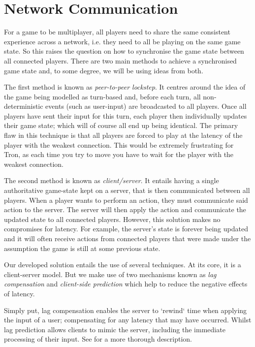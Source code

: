 \documentclass{standalone}
\begin{document}
	\section{Network Communication}
		For a game to be multiplayer, all players need to share the same consistent experience across a network, i.e. they need to all be playing on the same game state. So this raises the question on how to synchronise the game state between all connected players. There are two main methods to achieve a synchronised game state and, to some degree, we will be using ideas from both.

		The first method is known as \emph{peer-to-peer lockstep}. It centres around the idea of the game being modelled as turn-based and, before each turn, all non-deterministic events (such as user-input) are broadcasted to all players. Once all players have sent their input for this turn, each player then individually updates their game state; which will of course all end up being identical. The primary flaw in this technique is that all players are forced to play at the latency of the player with the weakest connection. This would be extremely frustrating for Tron, as each time you try to move you have to wait for the player with the weakest connection.

		The second method is known as \emph{client/server}. It entails having a single authoritative game-state kept on a server, that is then communicated between all players. When a player wants to perform an action, they must communicate said action to the server. The server will then apply the action and communicate the updated state to all connected players. However, this solution makes no compromises for latency. For example, the server's state is forever being updated and it will often receive actions from connected players that were made under the assumption the game is still at some previous state.

		Our developed solution entails the use of several techniques. At its core, it is a client-server model. But we make use of two mechanisms known as \emph{lag compensation}\parencite{LagCompensation} and \emph{client-side prediction}\parencite{LagPrediction} which help to reduce the negative effects of latency.\label{sec:lagCompensation}

		Simply put, lag compensation enables the server to `rewind` time when applying the input of a user; compensating for any latency that may have occurred. Whilst lag prediction allows clients to mimic the server, including the immediate processing of their input. See \parencite{LatencyCompensating} for a more thorough description.
\end{document}
